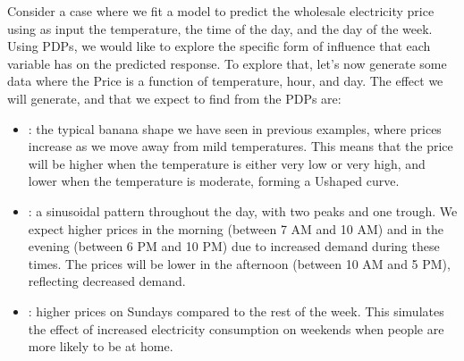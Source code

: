\documentclass[letterpaper,10pt,english]{jupyterBook}
\begin{document}
\sphinxAtStartPar
Consider a case where we fit a model to predict the wholesale electricity price using as input the temperature, the time of the day, and the day of the week. Using PDPs, we would like to explore the specific form of influence that each variable has on the predicted response. To explore that, let’s now generate some data where the Price is a function of temperature, hour, and day. The effect we will generate, and that we expect to find from the PDPs are:
\begin{itemize}
\item {} 
\sphinxAtStartPar
{}: the typical banana shape we have seen in previous examples, where prices increase as we move away from mild temperatures. This means that the price will be higher when the temperature is either very low or very high, and lower when the temperature is moderate, forming a U\sphinxhyphen{}shaped curve.

\item {} 
\sphinxAtStartPar
{}: a sinusoidal pattern throughout the day, with two peaks and one trough. We expect higher prices in the morning (between 7 AM and 10 AM) and in the evening (between 6 PM and 10 PM) due to increased demand during these times. The prices will be lower in the afternoon (between 10 AM and 5 PM), reflecting decreased demand.

\item {} 
\sphinxAtStartPar
{}: higher prices on Sundays compared to the rest of the week. This simulates the effect of increased electricity consumption on weekends when people are more likely to be at home.

\end{itemize}
\end{document}
